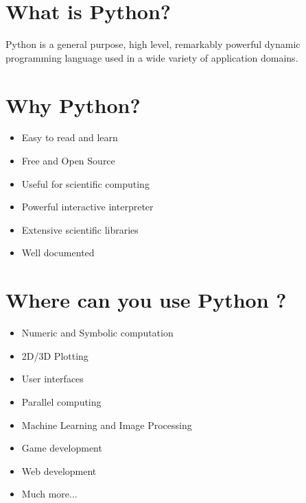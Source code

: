 \documentclass[final]{beamer}
\begin{document}
\begin{frame}[t]
\begin{multicols}{2}

\section{What is Python?}

Python is a general purpose, high level, remarkably powerful dynamic
programming language used in a wide variety of application domains.


\section{Why Python?}
\begin{itemize}
\item {Easy to read and learn}
\item {Free and Open Source}
\item {Useful for scientific computing}
\item {Powerful interactive interpreter}
\item {Extensive scientific libraries}
\item {Well documented}
\end{itemize}


\section{Where can you use Python ?}
\begin{itemize}
\item {Numeric and Symbolic computation}
\item {2D/3D Plotting}
\item {User interfaces}
\item {Parallel computing}
\item {Machine Learning and Image Processing}
\item {Game development}
\item {Web development}
\item {Much more...}  
\end{itemize}


\end{multicols}
\end{frame}
\end{document}
